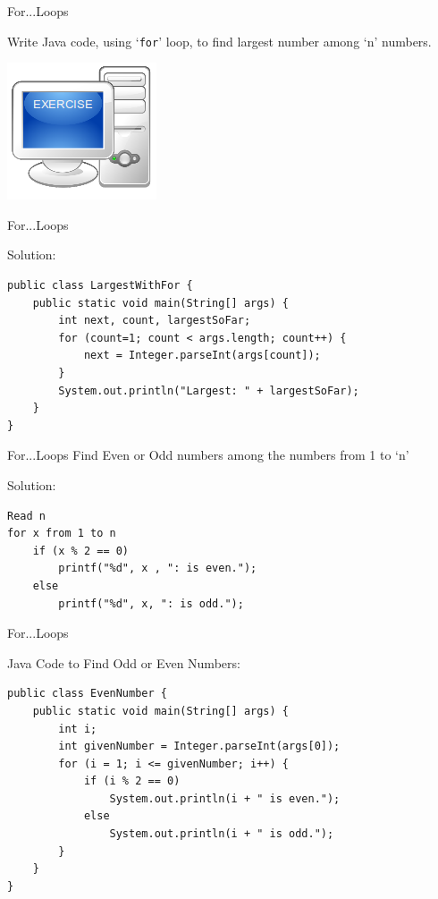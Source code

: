 \documentclass[14pt]{beamer}
\begin{document}
\begin{frame}{For...Loops}
\begin{minipage}{7cm}
Write Java code, using `\lstinline!for!' loop, to find largest number among `n' numbers.
\end{minipage}
\quad
\begin{minipage}{2cm}
 \includegraphics[scale=.5]{exercise.png}
\end{minipage}
\end{frame}

\begin{frame}[fragile]{For...Loops}
\begin{block}{Solution:}
\begin{lstlisting}[numbers=none]
public class LargestWithFor {
    public static void main(String[] args) {  
        int next, count, largestSoFar;  
        for (count=1; count < args.length; count++) {
            next = Integer.parseInt(args[count]);
        }
        System.out.println("Largest: " + largestSoFar);
    }
}
\end{lstlisting}

\end{block}
\end{frame}

\begin{frame}[fragile]{For...Loops}
Find Even or Odd numbers among the numbers from 1 to `n'
\begin{block}{Solution:}
\begin{lstlisting}[numbers=none]
Read n
for x from 1 to n
    if (x % 2 == 0) 
        printf("%d", x , ": is even.");
    else 
        printf("%d", x, ": is odd.");
\end{lstlisting}
\end{block}
\end{frame}

\begin{frame}[fragile]{For...Loops}
\begin{block}{Java Code to Find Odd or Even Numbers:}
\begin{lstlisting}[numbers=none]
 public class EvenNumber {
    public static void main(String[] args) {
        int i;
        int givenNumber = Integer.parseInt(args[0]);
        for (i = 1; i <= givenNumber; i++) {
            if (i % 2 == 0) 
                System.out.println(i + " is even.");
            else
                System.out.println(i + " is odd.");
        }
    }
}
\end{lstlisting}
\end{block}
\end{frame}
\end{document}
